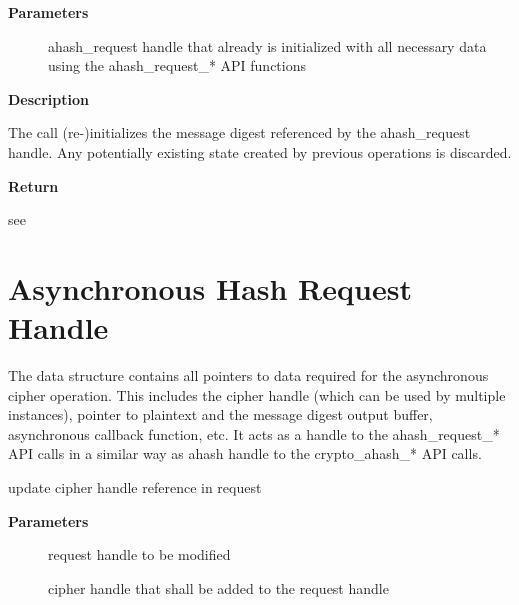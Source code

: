 \documentclass[a4paper,8pt,english]{sphinxmanual}
\begin{document}
\textbf{Parameters}
\begin{description}
\item[{}] \leavevmode
ahash\_request handle that already is initialized with all necessary
data using the ahash\_request\_* API functions

\end{description}

\textbf{Description}

The call (re-)initializes the message digest referenced by the ahash\_request
handle. Any potentially existing state created by previous operations is
discarded.

\textbf{Return}

see {\hyperref[crypto/api\string-digest:c.crypto_ahash_final]{\emph{}}}


\section{Asynchronous Hash Request Handle}
\label{crypto/api-digest:asynchronous-hash-request-handle}
The  data structure contains all pointers to data
required for the asynchronous cipher operation. This includes the cipher
handle (which can be used by multiple  instances), pointer
to plaintext and the message digest output buffer, asynchronous callback
function, etc. It acts as a handle to the ahash\_request\_* API calls in a
similar way as ahash handle to the crypto\_ahash\_* API calls.

\begin{fulllineitems}
\label{crypto/api-digest:c.ahash_request_set_tfm}
update cipher handle reference in request

\end{fulllineitems}


\textbf{Parameters}
\begin{description}
\item[{}] \leavevmode
request handle to be modified

\item[{}] \leavevmode
cipher handle that shall be added to the request handle

\end{description}
\end{document}
